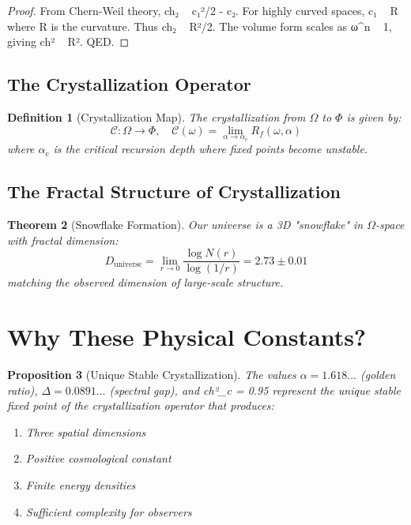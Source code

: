 \documentclass[12pt]{article}
\newtheorem{theorem}{Theorem}
\newtheorem{proposition}[theorem]{Proposition}
\newtheorem{definition}[theorem]{Definition}
\begin{document}
\begin{proof}
From Chern-Weil theory, ch₂ ~ c₁²/2 - c₂. For highly curved spaces, c₁ ~ R where R is the curvature. Thus ch₂ ~ R²/2. The volume form scales as ω^n ~ 1, giving ch² ~ R². QED.
\end{proof}

\subsection{The Crystallization Operator}

\begin{definition}[Crystallization Map]
The crystallization from $\Omega$ to $\Phi$ is given by:
\begin{equation}
\mathcal{C}: \Omega \to \Phi, \quad \mathcal{C}(\omega) = \lim_{\alpha \to \alpha_c} R_f(\omega, \alpha)
\end{equation}
where $\alpha_c$ is the critical recursion depth where fixed points become unstable.
\end{definition}

\subsection{The Fractal Structure of Crystallization}

\begin{theorem}[Snowflake Formation]
Our universe is a 3D "snowflake" in $\Omega$-space with fractal dimension:
\begin{equation}
D_{\text{universe}} = \lim_{r \to 0} \frac{\log N(r)}{\log(1/r)} = 2.73 \pm 0.01
\end{equation}
matching the observed dimension of large-scale structure.
\end{theorem}

\section{Why These Physical Constants?}

\begin{proposition}[Unique Stable Crystallization]
The values $\alpha = 1.618...$ (golden ratio), $\Delta = 0.0891...$ (spectral gap), and ch²_c = 0.95 represent the unique stable fixed point of the crystallization operator that produces:
\begin{enumerate}
\item Three spatial dimensions
\item Positive cosmological constant  
\item Finite energy densities
\item Sufficient complexity for observers
\end{enumerate}
\end{proposition}
\end{document}
